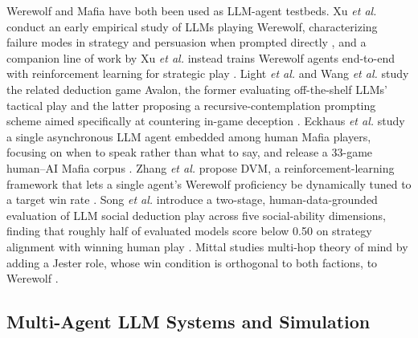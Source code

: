 \documentclass[10pt,conference]{IEEEtran}
\begin{document}
Werewolf and Mafia have both been used as LLM-agent testbeds. Xu \textit{et al.} conduct an early empirical study of LLMs playing Werewolf, characterizing failure modes in strategy and persuasion when prompted directly \cite{xu2023exploring}, and a companion line of work by Xu \textit{et al.} instead trains Werewolf agents end-to-end with reinforcement learning for strategic play \cite{xu2024language}. Light \textit{et al.} and Wang \textit{et al.} study the related deduction game Avalon, the former evaluating off-the-shelf LLMs' tactical play \cite{light2023text} and the latter proposing a recursive-contemplation prompting scheme aimed specifically at countering in-game deception \cite{wang2023avalon}. Eckhaus \textit{et al.} study a single asynchronous LLM agent embedded among human Mafia players, focusing on when to speak rather than what to say, and release a 33-game human--AI Mafia corpus \cite{eckhaus2025time}. Zhang \textit{et al.} propose DVM, a reinforcement-learning framework that lets a single agent's Werewolf proficiency be dynamically tuned to a target win rate \cite{zhang2025dvm}. Song \textit{et al.} introduce a two-stage, human-data-grounded evaluation of LLM social deduction play across five social-ability dimensions, finding that roughly half of evaluated models score below 0.50 on strategy alignment with winning human play \cite{song2025beyond}. Mittal studies multi-hop theory of mind by adding a Jester role, whose win condition is orthogonal to both factions, to Werewolf \cite{mittal2026triadic}.

\subsection{Multi-Agent LLM Systems and Simulation}
\end{document}
